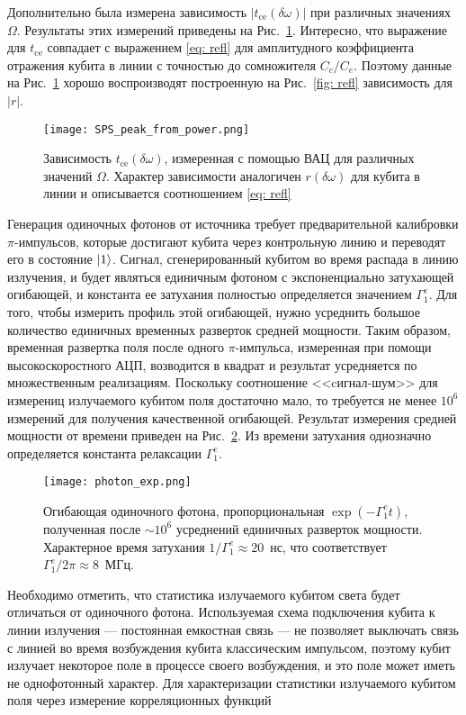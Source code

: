 Дополнительно была измерена зависимость $|t_{\text{ce}}(\delta\omega)|$ при различных значениях $\Omega$. Результаты этих измерений приведены на Рис.~\ref{fig: sps_peak_from_power}. Интересно, что выражение для $t_{\text{ce}}$ совпадает с выражением \eqref{eq: refl} для амплитудного коэффициента отражения кубита в линии с точностью до сомножителя $C_c/C_e$. Поэтому данные на Рис.~\ref{fig: sps_peak_from_power} хорошо воспроизводят построенную на Рис.~\ref{fig: refl} зависимость для $|r|$. 
\begin{figure}[h]
	\centering
	\texttt{[image: SPS\_peak\_from\_power.png]}
	\caption[Зависимость $t_{\text{ce}}(\delta\omega)$, измеренная с помощью ВАЦ]{Зависимость $t_{\text{ce}}(\delta\omega)$, измеренная с помощью ВАЦ для различных значений $\Omega$. Характер зависимости аналогичен $r(\delta\omega)$ для кубита в линии и описывается соотношением \eqref{eq: refl}}
	\label{fig: sps_peak_from_power}
\end{figure}
Генерация одиночных фотонов от источника требует предварительной калибровки $\pi$-импульсов, которые достигают кубита через контрольную линию и переводят его в состояние $\ket{1}$. Сигнал, сгенерированный кубитом во время распада в линию излучения, и будет являться единичным фотоном с экспоненциально затухающей огибающей, и константа ее затухания полностью определяется значением $\Gamma_1^e$. Для того, чтобы измерить профиль этой огибающей, нужно усреднить большое количество единичных временных разверток средней мощности. Таким образом, временная развертка поля после одного $\pi$-импульса, измеренная при помощи высокоскоростного $АЦП$, возводится в квадрат и результат усредняется по множественным реализациям. Поскольку соотношение <<cигнал-шум>> для измерениц излучаемого кубитом поля достаточно мало, то требуется не менее $10^6$ измерений для получения качественной огибающей. Результат измерения средней мощности от времени приведен на Рис.~\ref{fig: photon_exp}.
Из времени затухания однозначно определяется константа релаксации $\Gamma_1^e$.
\begin{figure}[h]
	\centering
	\texttt{[image: photon\_exp.png]}
	\caption[Огибающая одиночного фотона, пропорциональная $\exp(-\Gamma^e_1 t)$]{Огибающая одиночного фотона, пропорциональная $\exp(-\Gamma^e_1 t)$, полученная после $\sim 10^6$ усреднений единичных разверток мощности. Характерное время затухания $1/\Gamma^e_1 \approx 20 $~нс, что соответствует $\Gamma^e_1/2\pi\approx8$~МГц.}
	\label{fig: photon_exp}
\end{figure}
Необходимо отметить, что статистика излучаемого кубитом света будет отличаться от одиночного фотона. Используемая схема подключения кубита к линии излучения --- постоянная емкостная связь --- не позволяет выключать связь с линией во время возбуждения кубита классическим импульсом, поэтому кубит излучает некоторое поле в процессе своего возбуждения, и это поле может иметь не однофотонный характер. Для характеризации статистики излучаемого кубитом поля через измерение корреляционных функций 

